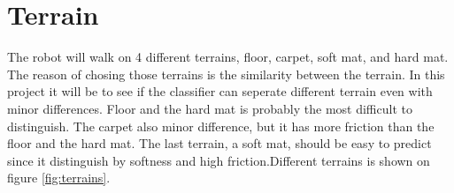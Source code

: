 \documentclass[USenglish]{ifimaster}  %
\begin{document}
\section{Terrain}
The robot will walk on 4 different terrains, floor, carpet, soft mat, and hard mat. The reason of chosing those terrains is the similarity between the terrain. In this project it will be to see if the classifier can seperate different terrain even with minor differences. Floor and the hard mat is probably the most difficult to distinguish. The carpet also minor difference, but it has more friction than the floor and the hard mat. The last terrain, a soft mat, should be easy to predict since it distinguish by softness and high friction.Different terrains is shown on figure \ref{fig:terrains}.

\end{document}
